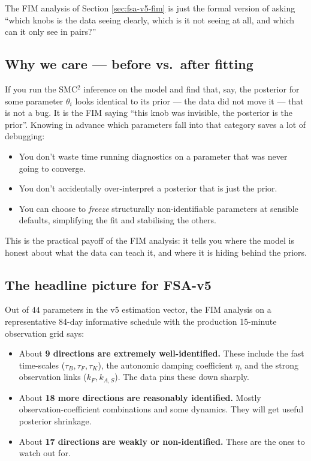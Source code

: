 The FIM analysis of Section \ref{sec:fsa-v5-fim} is just the formal version of asking ``which knobs is the data seeing clearly, which is it not seeing at all, and which can it only see in pairs?''

\subsection{Why we care --- before vs.\ after fitting}

If you run the SMC$^2$ inference on the model and find that, say, the posterior for some parameter $\theta_i$ looks identical to its prior --- the data did not move it --- that is not a bug. It is the FIM saying ``this knob was invisible, the posterior is the prior''. Knowing in advance which parameters fall into that category saves a lot of debugging:

\begin{itemize}
  \item You don't waste time running diagnostics on a parameter that was never going to converge.
  \item You don't accidentally over-interpret a posterior that is just the prior.
  \item You can choose to \emph{freeze} structurally non-identifiable parameters at sensible defaults, simplifying the fit and stabilising the others.
\end{itemize}

This is the practical payoff of the FIM analysis: it tells you where the model is honest about what the data can teach it, and where it is hiding behind the priors.

\subsection{The headline picture for FSA-v5}

Out of $44$ parameters in the v5 estimation vector, the FIM analysis on a representative 84-day informative schedule with the production 15-minute observation grid says:

\begin{itemize}
  \item About \textbf{9 directions are extremely well-identified.} These include the fast time-scales ($\tau_B, \tau_F, \tau_K$), the autonomic damping coefficient $\eta$, and the strong observation links ($k_F, k_{A,S}$). The data pins these down sharply.
  \item About \textbf{18 more directions are reasonably identified.} Mostly observation-coefficient combinations and some dynamics. They will get useful posterior shrinkage.
  \item About \textbf{17 directions are weakly or non-identified.} These are the ones to watch out for.
\end{itemize}

